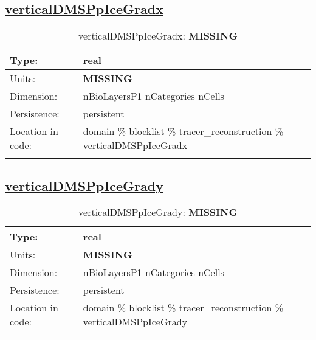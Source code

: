 \subsection[verticalDMSPpIceGradx]{\hyperref[sec:var_tab_tracer_reconstruction]{verticalDMSPpIceGradx}}
\label{subsec:var_sec_tracer_reconstruction_verticalDMSPpIceGradx}
\begin{center}
\begin{longtable}{| p{2.0in} | p{4.0in} |}
        \hline 
        Type: & real \\
        \hline 
        Units: & {\bf \color{red} MISSING} \\
        \hline 
        Dimension: & nBioLayersP1 nCategories nCells \\
        \hline 
        Persistence: & persistent \\
        \hline 
         Location in code: & domain \% blocklist \% tracer\_reconstruction \% verticalDMSPpIceGradx \\
         \hline 
    \caption{verticalDMSPpIceGradx: {\bf \color{red} MISSING}}
\end{longtable}
\end{center}
\subsection[verticalDMSPpIceGrady]{\hyperref[sec:var_tab_tracer_reconstruction]{verticalDMSPpIceGrady}}
\label{subsec:var_sec_tracer_reconstruction_verticalDMSPpIceGrady}
\begin{center}
\begin{longtable}{| p{2.0in} | p{4.0in} |}
        \hline 
        Type: & real \\
        \hline 
        Units: & {\bf \color{red} MISSING} \\
        \hline 
        Dimension: & nBioLayersP1 nCategories nCells \\
        \hline 
        Persistence: & persistent \\
        \hline 
         Location in code: & domain \% blocklist \% tracer\_reconstruction \% verticalDMSPpIceGrady \\
         \hline 
    \caption{verticalDMSPpIceGrady: {\bf \color{red} MISSING}}
\end{longtable}
\end{center}
